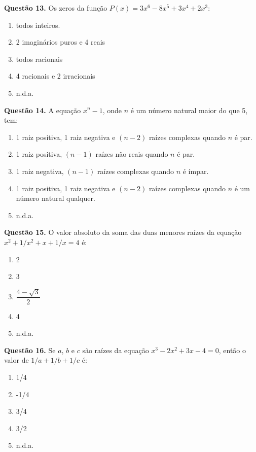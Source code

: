 \documentclass[11pt]{article}
\begin{document}
\textbf{Questão 13.} Os  zeros  da  função $P(x) = 3x^6 - 8x^5 + 3x^4 + 2x^3$:

\begin{enumerate}[\bf A (\quad)]
    \item todos inteiros.
    \item 2 imaginários puros e 4 reais
    \item todos racionais 
    \item 4 racionais e 2 irracionais
    \item n.d.a.
\end{enumerate}


\textbf{Questão 14.} A equação $x^n - 1$, onde $n$ é um número natural maior do que 5, tem:

\begin{enumerate}[\bf A (\quad)]
    \item 1  raiz  positiva,  1  raiz  negativa  e  $(n - 2)$  raízes  complexas quando $n$ é par. 
    \item 1 raiz positiva, $(n - 1)$ raízes não reais quando $n$ é par. 
    \item 1  raiz  negativa,  $(n - 1)$  raízes  complexas  quando  $n$  é  ímpar.
    \item 1  raiz  positiva,  1  raiz  negativa  e  $(n - 2)$  raízes  complexas quando $n$ é um número natural qualquer. 
    \item n.d.a.
\end{enumerate}

\textbf{Questão 15.} O valor absoluto da soma das duas menores raízes da equação $x^2 + 1 / x^2 + x + 1 / x = 4$ é:

\begin{multicols}{5}
\begin{enumerate}[\bf A (\quad)]
    \item 2
    \item 3
    \item $\dfrac{4-\sqrt{3}}{2}$
    \item 4
    \item n.d.a.
\end{enumerate}
\end{multicols}

\textbf{Questão 16.} Se $a$, $b$ e $c$ são raízes da equação $x^3 - 2x^2 + 3x - 4 = 0$, então o valor de $1 / a + 1 / b+ 1 / c$ é:

\begin{multicols}{5}
    \begin{enumerate}[\bf A (\quad)]
        \item 1/4
        \item -1/4
        \item 3/4
        \item 3/2
        \item n.d.a.
    \end{enumerate}
\end{multicols}
\end{document}
